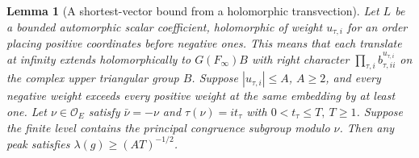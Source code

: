 \documentclass[a4paper,11pt]{article}
\newtheorem{lemma}[proposition]{Lemma}
\theoremstyle{definition}
\theoremstyle{remark}
\numberwithin{equation}{section}
\begin{document}
\begin{lemma}[A shortest-vector bound from a holomorphic transvection]
\leavevmode\label{lem:peakminimum813}
Let \(L\) be a bounded automorphic scalar coefficient,
holomorphic of weight \(u_{\tau,i}\) for an order placing
positive coordinates before negative ones. This means
that each translate at infinity extends holomorphically
to \(G(F_\infty)B\) with right character
\(\prod_{\tau,i}b_{\tau,ii}^{u_{\tau,i}}\) on the complex
upper triangular group \(B\). Suppose \(|u_{\tau,i}|\le A\),
\(A\ge2\), and every negative weight exceeds every positive
weight at the same embedding by at least one. Let
\(\nu\in\mathcal O_E\) satisfy \(\bar\nu=-\nu\) and
\(\tau(\nu)=i t_\tau\) with \(0<t_\tau\le T,\ T\ge1\).
Suppose the finite level contains the principal congruence
subgroup modulo \(\nu\). Then any peak satisfies
\(\lambda(g)\ge(AT)^{-1/2}\).
\end{lemma}
\end{document}
